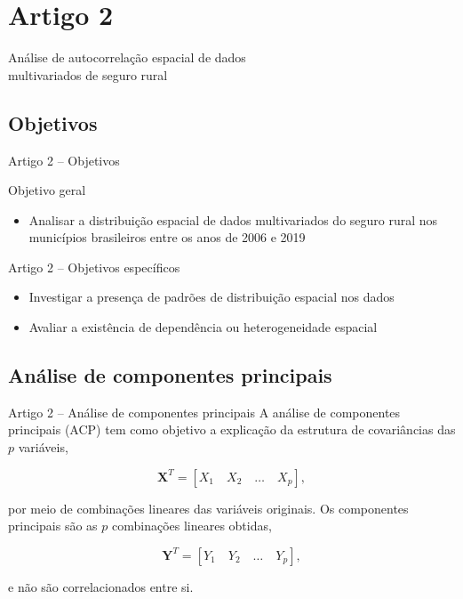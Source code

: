\documentclass[aspectratio=169]{beamer}
\begin{document}
\section{Artigo 2}

\begin{frame}
\begin{alertblock}{}
    \begin{center}
        \vspace{0.1cm}
        \Large Análise de autocorrelação espacial de dados \\
        multivariados de seguro rural
        \vspace{0.1cm}
    \end{center}
\end{alertblock}
\end{frame}
\subsection{Objetivos}

\begin{frame}{Artigo 2 -- Objetivos} 
	\begin{exampleblock}{Objetivo geral}
	   \begin{itemize}
		    \item Analisar a distribuição espacial de dados multivariados do seguro rural nos municípios brasileiros entre os anos de 2006 e 2019
	    \end{itemize}
	\end{exampleblock}
	\vspace{0.5cm}
	\begin{exampleblock}{Artigo 2 -- Objetivos específicos}
	   \begin{itemize}
		    \item Investigar a presença de padrões de distribuição espacial nos dados
		    \item Avaliar a existência de dependência ou heterogeneidade espacial
	    \end{itemize}
	\end{exampleblock}
\end{frame}

\subsection{Análise de componentes principais}

\begin{frame}{Artigo 2 -- Análise de componentes principais}
    A análise de componentes principais (ACP) tem como objetivo a explicação da estrutura de covariâncias das $p$ variáveis, 
    \begin{block}{}
        $$\boldsymbol{X}^T = [X_1 \quad X_2 \quad \dots \quad X_p],$$ 
    \end{block}
    \noindent por meio de combinações lineares das variáveis originais. Os componentes principais são as $p$ combinações lineares obtidas, 
    \begin{block}{}
        $$\boldsymbol{Y}^T = [Y_1 \quad Y_2 \quad \dots \quad Y_p],$$ 
    \end{block}
    \noindent e não são correlacionados entre si.
\end{frame}
\end{document}
